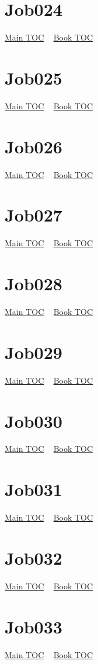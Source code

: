 \documentclass{book}
\begin{document}
  \section{Job024}\hyperlink{toc}{Main TOC} ~ \hyperref[subsec:Job]{Book TOC} 
  \section{Job025}\hyperlink{toc}{Main TOC} ~ \hyperref[subsec:Job]{Book TOC} 
  \section{Job026}\hyperlink{toc}{Main TOC} ~ \hyperref[subsec:Job]{Book TOC} 
  \section{Job027}\hyperlink{toc}{Main TOC} ~ \hyperref[subsec:Job]{Book TOC} 
  \section{Job028}\hyperlink{toc}{Main TOC} ~ \hyperref[subsec:Job]{Book TOC} 
  \section{Job029}\hyperlink{toc}{Main TOC} ~ \hyperref[subsec:Job]{Book TOC} 
  \section{Job030}\hyperlink{toc}{Main TOC} ~ \hyperref[subsec:Job]{Book TOC} 
  \section{Job031}\hyperlink{toc}{Main TOC} ~ \hyperref[subsec:Job]{Book TOC} 
  \section{Job032}\hyperlink{toc}{Main TOC} ~ \hyperref[subsec:Job]{Book TOC} 
  \section{Job033}\hyperlink{toc}{Main TOC} ~ \hyperref[subsec:Job]{Book TOC} 
\end{document}

